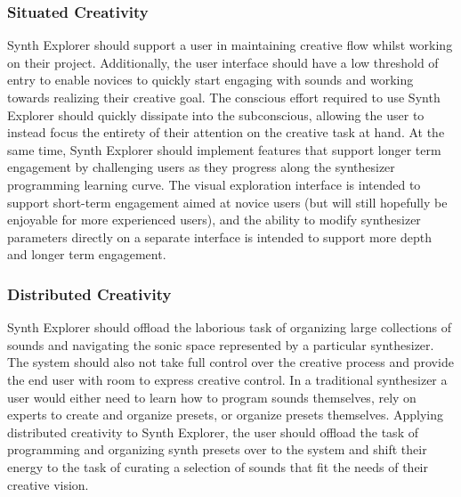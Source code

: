 \subsubsection{Situated Creativity}
Synth Explorer should support a user in maintaining creative flow whilst working on their project. Additionally, the user interface should have a low threshold of entry to enable novices to quickly start engaging with sounds and working towards realizing their creative goal. The conscious effort required to use Synth Explorer should quickly dissipate into the subconscious, allowing the user to instead focus the entirety of their attention on the creative task at hand. At the same time, Synth Explorer should implement features that support longer term engagement by challenging users as they progress along the synthesizer programming learning curve. The visual exploration interface is intended to support short-term engagement aimed at novice users (but will still hopefully be enjoyable for more experienced users), and the ability to modify synthesizer parameters directly on a separate interface is intended to support more depth and longer term engagement.


\subsubsection{Distributed Creativity}
Synth Explorer should offload the laborious task of organizing large collections of sounds and navigating the sonic space represented by a particular synthesizer. The system should also not take full control over the creative process and provide the end user with room to express creative control. In a traditional synthesizer a user would either need to learn how to program sounds themselves, rely on experts to create and organize presets, or organize presets themselves. Applying distributed creativity to Synth Explorer, the user should offload the task of programming and organizing synth presets over to the system and shift their energy to the task of curating a selection of sounds that fit the needs of their creative vision.

